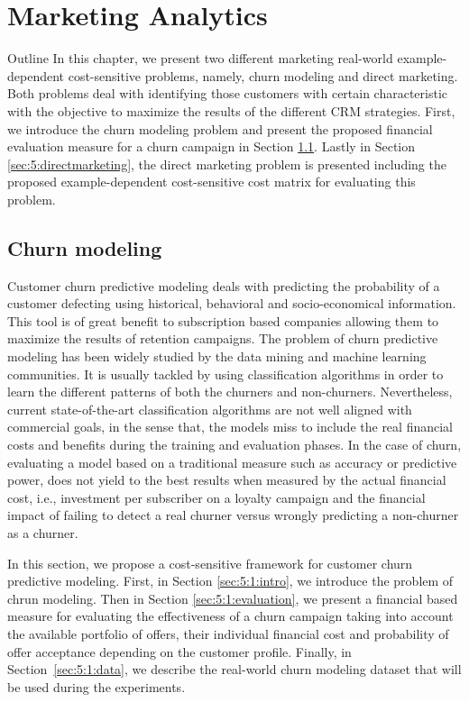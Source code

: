 \chapter{Marketing Analytics}\label{ch:5}

\begin{remark}{Outline}
In this chapter, we present two different marketing real-world example-dependent 
cost-sensitive problems, namely, churn modeling and direct marketing. Both problems deal 
with identifying those customers with certain characteristic with the objective to maximize the 
results of the different CRM strategies.
First, we introduce the churn modeling problem and present the proposed financial evaluation 
measure for a churn campaign in Section \ref{sec:5:churn}. Lastly in Section 
\ref{sec:5:directmarketing}, the direct marketing problem is presented including the proposed 
example-dependent cost-sensitive cost matrix for evaluating this problem.
\end{remark}


\section{Churn modeling}
\label{sec:5:churn}

Customer churn predictive modeling deals with predicting the probability of a customer defecting 
using historical, behavioral and socio-economical information. This tool is of great benefit to 
subscription based companies allowing them to maximize the results of retention campaigns. The 
problem of churn predictive modeling has been widely studied by the data mining and machine learning
communities. It is usually tackled by using classification algorithms in order to learn the 
different patterns of both the churners and non-churners. Nevertheless, current state-of-the-art 
classification algorithms are not well aligned with commercial goals, in the sense that, the models 
miss to include the real financial costs and benefits during the training and evaluation phases. In 
the case of churn, evaluating a model based on a traditional measure such as accuracy or predictive 
power, does not yield to the best results when measured by the actual financial cost, i.e., 
investment per subscriber on a loyalty campaign and the financial impact of failing to detect a 
real churner versus wrongly predicting a non-churner as a churner.

In this section, we propose a cost-sensitive framework for customer churn predictive 
modeling. First, in Section \ref{sec:5:1:intro}, we introduce 
the problem of chrun modeling. Then in Section \ref{sec:5:1:evaluation}, we present a financial 
based measure for evaluating the effectiveness of a churn campaign taking into account the 
available 
portfolio of offers, their individual financial cost and probability of offer acceptance depending 
on the customer profile. Finally, in Section~\ref{sec:5:1:data}, we describe the real-world churn 
modeling dataset that will be used during the experiments.



